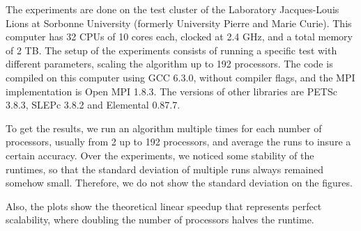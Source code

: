 The experiments are done on the test cluster of the Laboratory Jacques-Louis Lions at Sorbonne University (formerly University Pierre and Marie Curie).
This computer has 32 CPUs of 10 cores each, clocked at 2.4 GHz, and a total memory of 2 TB.
The setup of the experiments consists of running a specific test with different parameters, scaling the algorithm up to 192 processors.
The code is compiled on this computer using GCC 6.3.0, without compiler flags, and the MPI implementation is Open MPI 1.8.3.
The versions of other libraries are PETSc 3.8.3, SLEPc 3.8.2 and Elemental 0.87.7.

To get the results, we run an algorithm multiple times for each number of processors, usually from 2 up to 192 processors, and average the runs to insure a certain accuracy.
Over the experiments, we noticed some stability of the runtimes, so that the standard deviation of multiple runs always remained somehow small.
Therefore, we do not show the standard deviation on the figures.

Also, the plots show the theoretical linear speedup that represents perfect scalability, where doubling the number of processors halves the runtime.
